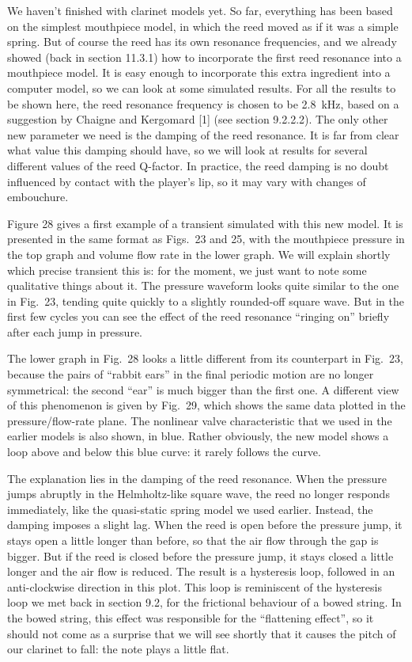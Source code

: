   We haven’t finished with clarinet models yet. So far, everything has been 
  based on the simplest mouthpiece model, in which the reed moved as if it was 
  a simple spring. But of course the reed has its own resonance frequencies, 
  and we already showed (back in section 11.3.1) how to incorporate the first 
  reed resonance into a mouthpiece model. It is easy enough to incorporate this 
  extra ingredient into a computer model, so we can look at some simulated 
  results. For all the results to be shown here, the reed resonance frequency 
  is chosen to be 2.8~kHz, based on a suggestion by Chaigne and Kergomard [1] 
  (see section 9.2.2.2). The only other new parameter we need is the damping of 
  the reed resonance. It is far from clear what value this damping should have, 
  so we will look at results for several different values of the reed Q-factor. 
  In practice, the reed damping is no doubt influenced by contact with the 
  player's lip, so it may vary with changes of embouchure. 

  Figure 28 gives a first example of a transient simulated with this new model. 
  It is presented in the same format as Figs.\ 23 and 25, with the mouthpiece 
  pressure in the top graph and volume flow rate in the lower graph. We will 
  explain shortly which precise transient this is: for the moment, we just want 
  to note some qualitative things about it. The pressure waveform looks quite 
  similar to the one in Fig.\ 23, tending quite quickly to a slightly 
  rounded-off square wave. But in the first few cycles you can see the effect 
  of the reed resonance “ringing on” briefly after each jump in pressure. 

  The lower graph in Fig.\ 28 looks a little different from its counterpart in 
  Fig.\ 23, because the pairs of “rabbit ears” in the final periodic motion are 
  no longer symmetrical: the second “ear” is much bigger than the first one. A 
  different view of this phenomenon is given by Fig.\ 29, which shows the same 
  data plotted in the pressure/flow-rate plane. The nonlinear valve 
  characteristic that we used in the earlier models is also shown, in blue. 
  Rather obviously, the new model shows a loop above and below this blue curve: 
  it rarely follows the curve. 

  The explanation lies in the damping of the reed resonance. When the pressure 
  jumps abruptly in the Helmholtz-like square wave, the reed no longer responds 
  immediately, like the quasi-static spring model we used earlier. Instead, the 
  damping imposes a slight lag. When the reed is open before the pressure jump, 
  it stays open a little longer than before, so that the air flow through the 
  gap is bigger. But if the reed is closed before the pressure jump, it stays 
  closed a little longer and the air flow is reduced. The result is a 
  hysteresis loop, followed in an anti-clockwise direction in this plot. This 
  loop is reminiscent of the hysteresis loop we met back in section 9.2, for 
  the frictional behaviour of a bowed string. In the bowed string, this effect 
  was responsible for the ``flattening effect'', so it should not come as a 
  surprise that we will see shortly that it causes the pitch of our clarinet to 
  fall: the note plays a little flat. 

